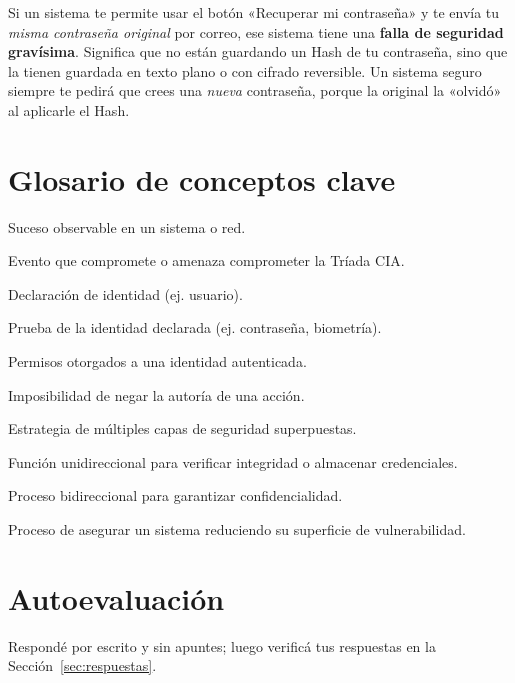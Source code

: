\documentclass[11pt,a4paper]{article}
\begin{document}
\begin{reflexion}
Si un sistema te permite usar el botón «Recuperar mi contraseña» y te envía tu \textit{misma contraseña original} por correo, ese sistema tiene una \textbf{falla de seguridad gravísima}. Significa que no están guardando un Hash de tu contraseña, sino que la tienen guardada en texto plano o con cifrado reversible. Un sistema seguro siempre te pedirá que crees una \textit{nueva} contraseña, porque la original la «olvidó» al aplicarle el Hash.
\end{reflexion}

\section{Glosario de conceptos clave}
\begin{description}[leftmargin=!, labelwidth=3.5cm, font=\bfseries]
  \item[Evento] Suceso observable en un sistema o red.
  \item[Incidente] Evento que compromete o amenaza comprometer la Tríada CIA.
  \item[Identificación] Declaración de identidad (ej. usuario).
  \item[Autenticación] Prueba de la identidad declarada (ej. contraseña, biometría).
  \item[Autorización] Permisos otorgados a una identidad autenticada.
  \item[No Repudio] Imposibilidad de negar la autoría de una acción.
  \item[Defensa en Profundidad] Estrategia de múltiples capas de seguridad superpuestas.
  \item[Hash] Función unidireccional para verificar integridad o almacenar credenciales.
  \item[Cifrado] Proceso bidireccional para garantizar confidencialidad.
  \item[Hardening] Proceso de asegurar un sistema reduciendo su superficie de vulnerabilidad.
\end{description}

\section{Autoevaluación}\label{sec:autoeval}
Respondé por escrito y sin apuntes; luego verificá tus respuestas en la Sección~\ref{sec:respuestas}.
\end{document}

